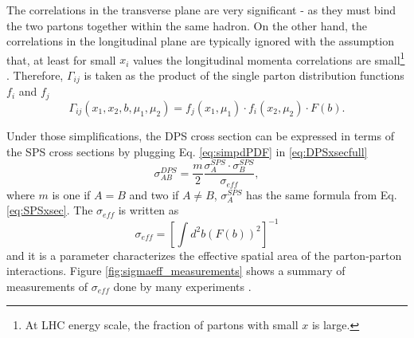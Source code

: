 The correlations in the transverse plane are very significant - as they must bind the two partons together within the same hadron. On the other hand, the correlations in the longitudinal plane are typically ignored with the assumption that, at least for small $x_i$ values the longitudinal momenta correlations are small\footnote{At LHC energy scale, the fraction of partons with small $x$ is large.} \cite{gaunt2010double}. Therefore, $\Gamma_{ij}$ is taken as the product of the single parton distribution functions $f_i$ and $f_j$
\begin{equation}\label{eq:simpdPDF}
    \Gamma_{ij}(x_1, x_2, b, \mu_1, \mu_2) = f_j(x_1, \mu_1) \cdot f_i(x_2, \mu_2) \cdot F(b).
\end{equation}

Under those simplifications, the DPS cross section can be expressed in terms of the SPS cross sections by plugging Eq. \ref{eq:simpdPDF} in \ref{eq:DPSxsecfull}
\begin{equation}
    \sigma_{AB}^{DPS} = \frac{m}{2} \frac{\sigma_A^{SPS} \cdot \sigma_B^{SPS}}{\sigma_{eff}},
\end{equation}
where $m$ is one if $A = B$ and two if $A \neq  B$, $\sigma^{SPS}_A$ has the same formula from Eq. \ref{eq:SPSxsec}. The $\sigma_{eff}$ is written as
\begin{equation}\label{eq:sigmaeff}
    \sigma_{eff} = \left[ \int d^2b (F(b))^2 \right]^{-1}
\end{equation}
and it is a parameter characterizes the effective spatial area of the parton-parton interactions. Figure \ref{fig:sigmaeff_measurements} shows a summary of measurements of $\sigma_{eff}$ done by many experiments \cite{afs1987double,alitti1991study,abe1993study,cdf1997double,abazov2010double,aaij2012observation,aad2013measurement,chatrchyan2014study,abazov2014double,abazov2014observation,alconada2015observation,aaboud2016study,aaij2016production,abazov2016study,abazov2016evidence,aaij2017measurement,atlas2017measurement,khachatryan2017observation,sirunyan2018constraints}.

